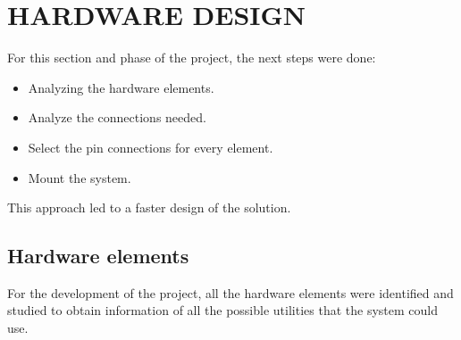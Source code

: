 \section{HARDWARE DESIGN}
For this section and phase of the project, the next steps were done:
\begin{itemize}
    \item Analyzing the hardware elements.
    \item Analyze the connections needed.
    \item Select the pin connections for every element.
    \item Mount the system.
\end{itemize}
This approach led to a faster design of the solution.
\subsection{Hardware elements}
For the development of the project, all the hardware elements were identified and studied to obtain information of all the possible utilities that the system could use.
